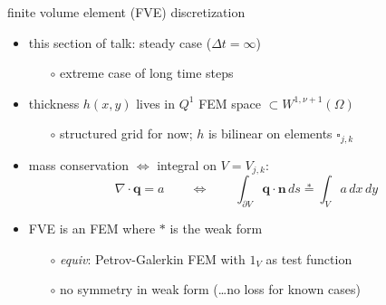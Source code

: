 \documentclass[xcolor={dvipsnames}]{beamer}
\newcommand\bn{\mathbf{n}}
\newcommand\bq{\mathbf{q}}
\newcommand\Div{\nabla\cdot}
\begin{document}
\begin{frame}{finite volume element (FVE) discretization}

\begin{itemize}
\item this section of talk: steady case ($\Delta t = \infty$)
    \begin{itemize}
    \item[$\circ$] extreme case of long time steps
    \end{itemize}
\item thickness $h(x,y)$ lives in $Q^1$ FEM space $\subset W^{1,\nu+1}(\Omega)$
    \begin{itemize}
    \item[$\circ$] structured grid for now; $h$ is bilinear on elements $\square_{j,k}$
    \end{itemize}
\item mass conservation $\iff$ integral on $V=V_{j,k}$:
    $$\Div \bq = a \qquad \iff \qquad \int_{\partial V} \bq \cdot \bn \,ds \stackrel{\ast}{=} \int_V a \,dx\,dy$$ 
\item FVE is an FEM where $\ast$ is the weak form
    \begin{itemize}
    \item[$\circ$] \emph{equiv}: Petrov-Galerkin FEM with $1_V$ as test function
    \item[$\circ$] no symmetry in weak form (\dots no loss for known cases)
    \end{itemize}
\end{itemize}

\begin{center}
\end{center}
\end{frame}
\end{document}
